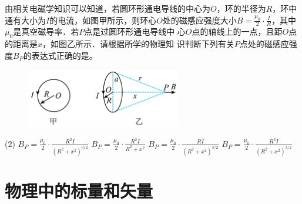\begin{exercises}
\item 由相关电磁学知识可以知道，若圆环形通电导线的中心为$O$，环的半径为$R$，环中
    通有大小为$I$的电流，如图甲所示，则环心$O$处的磁感应强度大小$B=\frac{\mu_{0}}
    {2}\cdot \frac{I}{R}$，其中$\mu_0$是真空磁导率．若$P$点是过圆环形通电导线中
    心$O$点的轴线上的一点，且距$O$点的距离是$x$，如图乙所示．请根据所学的物理知
    识判断下列有关$P$点处的磁感应强度$B_P$的表达式正确的是\choiceblank。
    \begin{figure}[H]
        \centering
        \includegraphics[width=0.6\textwidth]{fig/si_exercise_magfield_unit.png}
    \end{figure}
    \begin{tasks}(2)
        \task $B_P= \frac{\mu_{0}}{2}\cdot\frac{R^2 I}{\left( R^2 + x^2 \right)
        ^{3 / 2}}$
        \task $B_P= \frac{\mu_{0}}{2}\cdot\frac{R^2 I}{R^2 + x^2}$
        \task $B_P= \frac{\mu_{0}}{2}\cdot\frac{RI}{\left( R^2 + x^2 \right)^{3 
        / 2}}$
        \task $B_P= \frac{\mu_{0}}{2}\cdot\frac{R^3 I}{\left( R^2 + x^2 \right)
        ^{3 / 2}}$
    \end{tasks}
\end{exercises}

\section{物理中的标量和矢量}
